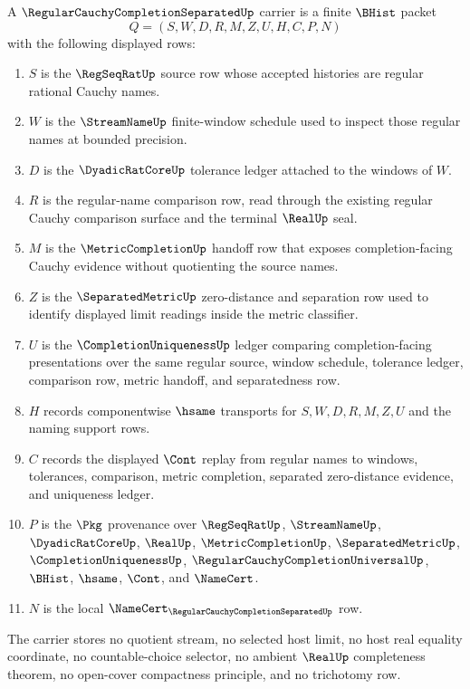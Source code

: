 \begin{definition}
\label{def:regular-cauchy-completion-separated-carrier}
A $\RegularCauchyCompletionSeparatedUp$ carrier is a finite $\BHist$ packet
$$
Q=(S,W,D,R,M,Z,U,H,C,P,N)
$$
with the following displayed rows:
\begin{enumerate}
\item $S$ is the $\RegSeqRatUp$ source row whose accepted histories are regular rational Cauchy names.
\item $W$ is the $\StreamNameUp$ finite-window schedule used to inspect those regular names at bounded precision.
\item $D$ is the $\DyadicRatCoreUp$ tolerance ledger attached to the windows of $W$.
\item $R$ is the regular-name comparison row, read through the existing regular Cauchy comparison surface and the terminal $\RealUp$ seal.
\item $M$ is the $\MetricCompletionUp$ handoff row that exposes completion-facing Cauchy evidence without quotienting the source names.
\item $Z$ is the $\SeparatedMetricUp$ zero-distance and separation row used to identify displayed limit readings inside the metric classifier.
\item $U$ is the $\CompletionUniquenessUp$ ledger comparing completion-facing presentations over the same regular source, window schedule, tolerance ledger, comparison row, metric handoff, and separatedness row.
\item $H$ records componentwise $\hsame$ transports for $S,W,D,R,M,Z,U$ and the naming support rows.
\item $C$ records the displayed $\Cont$ replay from regular names to windows, tolerances, comparison, metric completion, separated zero-distance evidence, and uniqueness ledger.
\item $P$ is the $\Pkg$ provenance over $\RegSeqRatUp$, $\StreamNameUp$, $\DyadicRatCoreUp$, $\RealUp$, $\MetricCompletionUp$, $\SeparatedMetricUp$, $\CompletionUniquenessUp$, $\RegularCauchyCompletionUniversalUp$, $\BHist$, $\hsame$, $\Cont$, and $\NameCert$.
\item $N$ is the local $\NameCert_{\RegularCauchyCompletionSeparatedUp}$ row.
\end{enumerate}
The carrier stores no quotient stream, no selected host limit, no host real equality coordinate, no countable-choice selector, no ambient $\RealUp$ completeness theorem, no open-cover compactness principle, and no trichotomy row.
\end{definition}

